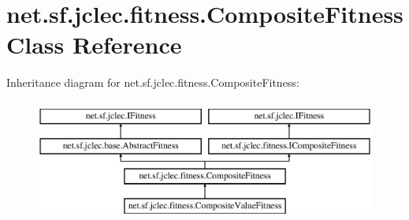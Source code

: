 \hypertarget{classnet_1_1sf_1_1jclec_1_1fitness_1_1_composite_fitness}{\section{net.\-sf.\-jclec.\-fitness.\-Composite\-Fitness Class Reference}
\label{classnet_1_1sf_1_1jclec_1_1fitness_1_1_composite_fitness}
}
Inheritance diagram for net.\-sf.\-jclec.\-fitness.\-Composite\-Fitness\-:\begin{figure}[H]
\begin{center}
\leavevmode
\includegraphics[height=4.000000cm]{classnet_1_1sf_1_1jclec_1_1fitness_1_1_composite_fitness}
\end{center}
\end{figure}
